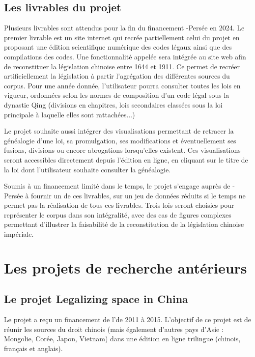 \subsection{Les livrables du projet}
Plusieurs livrables sont attendus pour la fin du financement \CollEx-Persée en 2024. Le premier livrable est un site internet qui recrée partiellement celui du projet \LSC en proposant une édition scientifique numérique des codes légaux ainsi que des compilations des codes.
Une fonctionnalité appelée \code sera intégrée au site web afin de reconstituer la législation chinoise entre 1644 et 1911. Ce \code permet de recréer artificiellement la législation à partir l'agrégation des différentes sources du corpus. Pour une année donnée, l'utilisateur pourra consulter toutes les lois en vigueur, ordonnées selon les normes de composition d'un code légal sous la dynastie Qing (divisions en chapitres, lois secondaires classées sous la loi principale à laquelle elles sont rattachées...)

Le projet souhaite aussi intégrer des visualisations permettant de retracer la généalogie d'une loi, sa promulgation, ses modifications et éventuellement ses fusions, divisions ou encore abrogations lorsqu'elles existent. Ces visualisations seront accessibles directement depuis l'édition en ligne, en cliquant sur le titre de la loi dont l'utilisateur souhaite consulter la généalogie. 

Soumis à un financement limité dans le temps, le projet \COREL s'engage auprès de \CollEx-Persée à fournir un \POC de ces livrables, sur un jeu de données réduits si le temps ne permet pas la réalisation de tous ces livrables. Trois lois seront choisies pour représenter le corpus dans son intégralité, avec des cas de figures complexes permettant d'illustrer la faisabilité de la reconstitution de la législation chinoise impériale.


\section{Les projets de recherche antérieurs}
\subsection{Le projet Legalizing space in China}

Le projet \LSC a reçu un financement de l'\ANR de 2011 à 2015. L'objectif de ce projet est de réunir les sources du droit chinois (mais également d'autres pays d'Asie : Mongolie, Corée, Japon, Vietnam) dans une édition en ligne trilingue (chinois, français et anglais). 

